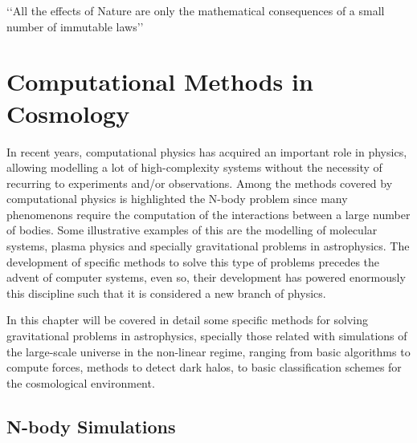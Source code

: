 \begin{savequote}[50mm]
‘‘All the effects of Nature are only the mathematical consequences of a 
small number of immutable laws’’
\end{savequote}




\chapter{Computational Methods in Cosmology}
\label{cha:N-BodySimulations}


In recent years, computational physics has acquired an important role in
physics, allowing modelling a lot of high-complexity systems without the
necessity of recurring to experiments and/or observations. Among the methods
covered by computational physics is highlighted the N-body problem since 
many phenomenons require the computation of the interactions between a
large number of bodies. Some illustrative examples of this are the 
modelling of molecular systems, plasma physics and specially gravitational
problems in astrophysics. The development of specific methods to solve 
this type of problems precedes the advent of computer systems, even so, 
their development has powered enormously this discipline such that it is
considered a new branch of physics.


In this chapter will be covered in detail some specific methods for solving
gravitational problems in astrophysics, specially those related with 
simulations of the large-scale universe in the non-linear regime, ranging 
from basic algorithms to compute forces, methods to detect dark halos, to
basic classification schemes for the cosmological environment.

 





\section{N-body Simulations}
\label{sec:N-bodySimulations}


